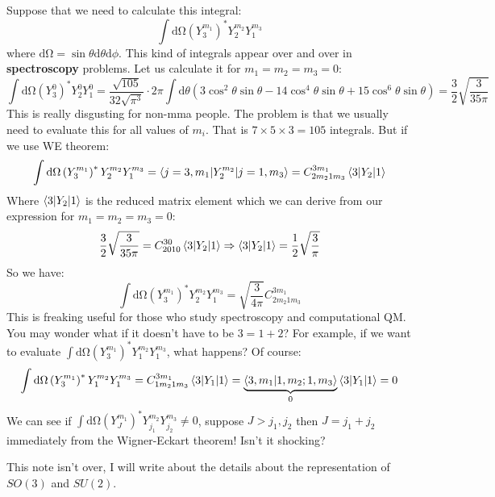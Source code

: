 \documentclass{article}
\begin{document}
	Suppose that we need to calculate this integral:
	\begin{equation*}
		\int \mathrm{d} \si{\ohm}\left( Y_{3}^{m_{1}}\right)^{*} Y_{2}^{m_{2}} Y_{1}^{m_{3}}
	\end{equation*}
	where $\mathrm{d} \si{\ohm}=\sin \theta \mathrm{d} \theta \mathrm{d} \phi $. This kind of integrals appear over and over in \textbf{spectroscopy} problems. Let us calculate it for $m_{1} =m_{2} =m_{3} =0$:
	\begin{equation*}
		\int \mathrm{d} \si{\ohm}\left( Y_{3}^{0}\right)^{*} Y_{2}^{0} Y_{1}^{0} =\frac{\sqrt{105}}{32\sqrt{\pi ^{3}}} \cdot 2\pi \int \mathrm{d} \theta \left( 3\cos^{2} \theta \sin \theta -14\cos^{4} \theta \sin \theta +15\cos^{6} \theta \sin \theta \right) =\frac{3}{2}\sqrt{\frac{3}{35\pi }}
	\end{equation*}
	This is really disgusting for non-mma people. The problem is that we usually need to evaluate this for all values of $m_{i} .$ That is $7\times 5\times 3=105$ integrals. But if we use WE theorem:
	\begin{equation*}
		\int \mathrm{d} \si{\ohm}\left( Y_{3}^{m_{1}}\right)^{*} Y_{2}^{m_{2}} Y_{1}^{m_{3}} =\mel**{j=3,m_{1}}{Y_{2}^{m_{2}}}{j=1,m_{3}} =C_{2m_{2} 1m_{3}}^{3m_{1}}\mel**{3}{Y_{2}}{1}
	\end{equation*}
	Where $\mel**{3}{Y_{2}}{1}$ is the reduced matrix element which we can derive from our expression for $m_{1} =m_{2} =m_{3} =0:$
	\begin{equation*}
		\frac{3}{2}\sqrt{\frac{3}{35\pi }} =C_{2010}^{30}\mel**{3}{Y_{2}}{1} \Rightarrow \mel**{3}{Y_{2}}{1} =\frac{1}{2}\sqrt{\frac{3}{\pi }}
	\end{equation*}
	So we have:
	\begin{equation*}
		\int \mathrm{d} \si{\ohm}\left( Y_{3}^{m_{1}}\right)^{*} Y_{2}^{m_{2}} Y_{1}^{m_{3}} =\sqrt{\frac{3}{4\pi }} C_{2m_{2} 1m_{3}}^{3m_{1}}
	\end{equation*}
	This is freaking useful for those who study spectroscopy and computational QM. You may wonder what if it doesn't have to be $3=1+2$? For example, if we want to evaluate $\int \mathrm{d} \si{\ohm}\left( Y_{3}^{m_{1}}\right)^{*} Y_{1}^{m_{2}} Y_{1}^{m_{3}}$, what happens? Of course:
	\begin{equation*}
		\int \mathrm{d} \si{\ohm}\left( Y_{3}^{m_{1}}\right)^{*} Y_{1}^{m_{2}} Y_{1}^{m_{3}} =C_{1m_{2} 1m_{3}}^{3m_{1}}\mel**{3}{Y_{1}}{1} =\underbrace{\bra{3,m_{1}}\ket{1,m_{2} ;1,m_{3}}}_{0}\mel**{3}{Y_{1}}{1} =0
	\end{equation*}
	We can see if $\int \mathrm{d} \si{\ohm}\left( Y_{J}^{m_{1}}\right)^{*} Y_{j_{1}}^{m_{2}} Y_{j_{2}}^{m_{3}} \neq 0$, suppose $J > j_{1} ,j_{2}$ then $J=j_{1} +j_{2}$ immediately from the Wigner-Eckart theorem! Isn't it shocking? 
	
	
	
	
	
	
	
	
	
	This note isn't over, I will write about the details about the representation of $SO( 3)$ and $SU( 2)$. 
	
\end{document}
